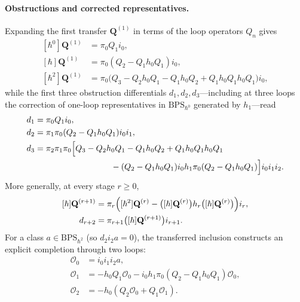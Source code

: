\documentclass[11pt]{article}
\numberwithin{equation}{section}
\numberwithin{figure}{section}
\numberwithin{table}{section}
\begin{document}
\paragraph{Obstructions and corrected representatives.}\label{the-first-obstruction-maps}
\label{b-00695}\label{local-ch8-transfer-coefficients-intro}%
Expanding the first transfer $\mathbf Q^{(1)}$ in terms of the loop operators $Q_n$ gives
\begin{equation}\label{eq-first-page-series}
\begin{aligned}
[\hbar^0]\mathbf Q^{(1)}&=\pi_0Q_1i_0,\\
[\hbar]\mathbf Q^{(1)}&=\pi_0(Q_2-Q_1h_0Q_1)i_0,\\
[\hbar^2]\mathbf Q^{(1)}&=\pi_0\bigl(Q_3-Q_2h_0Q_1-Q_1h_0Q_2
+Q_1h_0Q_1h_0Q_1\bigr)i_0,
\end{aligned}
\end{equation}
while the first three obstruction differentials $d_1,d_2,d_3$---including at three loops the correction of one-loop representatives in $\mathrm{BPS}_{\hbar^0}$ generated by $h_1$---read
\begin{equation}\label{b-00699}
\begin{aligned}
d_1&=\pi_0Q_1i_0,\\
d_2&=\pi_1\pi_0(Q_2-Q_1h_0Q_1)i_0i_1,\\
d_3&=\pi_2\pi_1\pi_0\Bigl[Q_3-Q_2h_0Q_1-Q_1h_0Q_2+Q_1h_0Q_1h_0Q_1\\
&\hspace{32mm}-(Q_2-Q_1h_0Q_1)i_0h_1\pi_0(Q_2-Q_1h_0Q_1)\Bigr]i_0i_1i_2.
\end{aligned}
\end{equation}
More generally, at every stage $r\ge0$,
\begin{equation}\label{local-ch8-transfer-coefficients}
\begin{aligned}
[\hbar]\mathbf Q^{(r+1)}
&=\pi_r\Bigl([\hbar^2]\mathbf Q^{(r)}-
\bigl([\hbar]\mathbf Q^{(r)}\bigr)h_r\bigl([\hbar]\mathbf Q^{(r)}\bigr)\Bigr)i_r,\\
d_{r+2}&=\pi_{r+1}\bigl([\hbar]\mathbf Q^{(r+1)}\bigr)i_{r+1}.
\end{aligned}
\end{equation}
For a class $a\in\mathrm{BPS}_{\hbar^2}$ (so $d_2i_2a=0$), the transferred inclusion constructs an explicit completion through two loops:
\begin{equation}\label{eq-two-loop-representative-transfer}
\begin{aligned}
\mathcal O_0&=i_0i_1i_2a,\\
\mathcal O_1&=-h_0Q_1\mathcal O_0
-i_0h_1\pi_0(Q_2-Q_1h_0Q_1)\mathcal O_0,\\
\mathcal O_2&=-h_0(Q_2\mathcal O_0+Q_1\mathcal O_1).
\end{aligned}
\end{equation}
\end{document}
